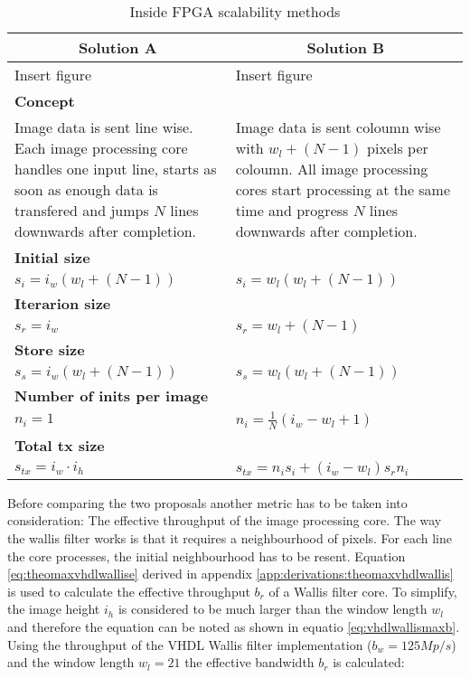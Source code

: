 \begin{table}[tb!]
    \centering
    \begin{tabular}{p{} p{}}
        \toprule
        \multicolumn{1}{c}{Solution A} & \multicolumn{1}{c}{Solution B} \\
        \midrule
        Insert figure & Insert figure \\\midrule
        \textbf{Concept} & \\
        Image data is sent line wise. Each image processing core handles one
        input line, starts as soon as enough data is transfered and jumps $N$ lines
        downwards after completion.
        &
        Image data is sent coloumn wise with $w_l+(N-1)$ pixels per coloumn. All
        image processing cores start processing at the same time and progress
        $N$ lines downwards after completion.
        \\\midrule
        \textbf{Initial size} & \\
        {\( 
            s_i = i_w(w_l+(N-1))
        \)}
        &
        {\( 
            s_i = w_l(w_l+(N-1))
        \)}
        \\\midrule
        \textbf{Iterarion size} & \\
        {\( 
            s_r  = i_w
        \)}
        &
        {\( 
            s_r  = w_l+(N-1)
        \)}
        \\\midrule
        \textbf{Store size} & \\
        {\( 
            s_s  = i_w(w_l+(N-1))
        \)}
        &
        {\( 
            s_s  = w_l(w_l+(N-1))
        \)}
        \\\midrule
        \textbf{Number of inits per image} & \\
        {\( 
            n_i  = 1
        \)}
        &
        {\( 
            n_i  = \frac{1}{N}(i_w-w_l+1)
        \)}
        \\\midrule
        \textbf{Total tx size} & \\
        {\( 
            s_{tx}  = i_w \cdot i_h
        \)}
        &
        {\( 
            s_{tx}  = n_i s_i + (i_w-w_l)s_r n_i
        \)}
        \\
        \bottomrule
    \end{tabular}
    \caption{Inside FPGA scalability methods}
    \label{tab:insidefpgascalability}
\end{table}

Before comparing the two proposals another metric has to be taken into
consideration: The effective throughput of the image processing core. The way
the wallis filter works is that it requires a neighbourhood of pixels. For each
line the core processes, the initial neighbourhood has to be resent. Equation
\ref{eq:theomaxvhdlwallise} derived in appendix 
\ref{app:derivations:theomaxvhdlwallis} is used to calculate the effective
throughput $b_r$ of a Wallis filter core. To simplify, the image height $i_h$ is
considered to be much larger than the window length $w_l$ and therefore the
equation can be noted as shown in equatio \ref{eq:vhdlwallismaxb}. Using the
throughput of the VHDL Wallis filter implementation ($b_w=125Mp/s$) and the
window length $w_l=21$ the effective bandwidth $b_r$ is calculated:

